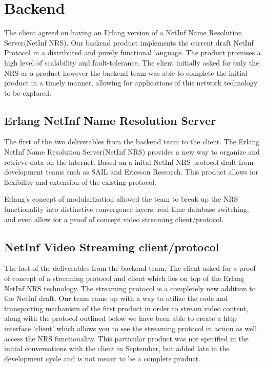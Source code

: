 \section {Backend}

The client agreed on having an Erlang version of a NetInf Name Resolution Server(NetInf NRS).  Our backend product implements the current draft NetInf Protocol in a distributed and purely functional language. The product promises a high level of scalability and fault-tolerance. The client initially asked for only the NRS as a product however the backend team was able to complete the initial product in a timely manner, allowing for applications of this network technology to be explored. 


\subsection {Erlang NetInf Name Resolution Server}
The first of the two deliverables from the backend team to the client. The Erlang NetInf Name Resolution Server(NetInf NRS) provides a new way to organize and retrieve data on the internet. Based on a inital NetInf NRS protocol draft from development teams such as SAIL and Ericsson Research. This product allows for flexibility and extension of the existing protocol.

Erlang's concept of modularization allowed the team to break up the NRS functionality into distinctive convergence layers, real-time database switching, and even allow for a proof of concept video streaming client/protocol. 

\subsection{NetInf Video Streaming client/protocol}

The last of the deliverables from the backend team. The client asked for a proof of concept of a streaming protocol and client which lies on top of the Erlang NetInf NRS technology. The streaming protocol is a completely new addition to the NetInf draft. Our team came up with a way to utilize the code and transporting mechanism of the first product in order to stream video content, along with the protocol outlined below we have been able to create a http interface 'client' which allows you to see the streaming protocol in action as well access the NRS functionality. This particular product was not specified in the initial conversations with the client in September, but added late in the development cycle and is not meant to be a complete product.

